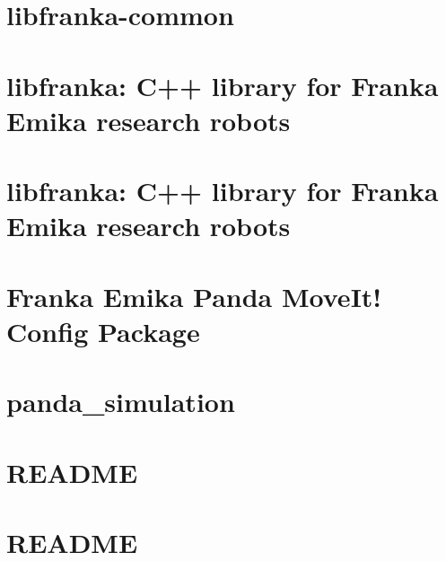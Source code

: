 \documentclass[twoside]{book}
\newcommand{\+}{\discretionary{\mbox{\scriptsize$\hookleftarrow$}}{}{}}
\begin{document}
\chapter{libfranka-\/common}
\label{md_smacc_sm_reference_library_sm_panda_moveit_libfranka_common_README}

\chapter{libfranka\+: C++ library for Franka Emika research robots}
\label{md_smacc_sm_reference_library_sm_panda_moveit_libfranka_doc_main}

\chapter{libfranka\+: C++ library for Franka Emika research robots}
\label{md_smacc_sm_reference_library_sm_panda_moveit_libfranka_README}

\chapter{Franka Emika Panda Move\+It! Config Package}
\label{md_smacc_sm_reference_library_sm_panda_moveit_panda_moveit_config_README}

\chapter{panda\+\_\+simulation}
\label{md_smacc_sm_reference_library_sm_panda_moveit_panda_simulation_README}

\chapter{R\+E\+A\+D\+ME}
\label{md_smacc_sm_reference_library_sm_pr2_plugs_README}

\chapter{R\+E\+A\+D\+ME}
\label{md_smacc_sm_reference_library_sm_respira_1_README}

\end{document}
